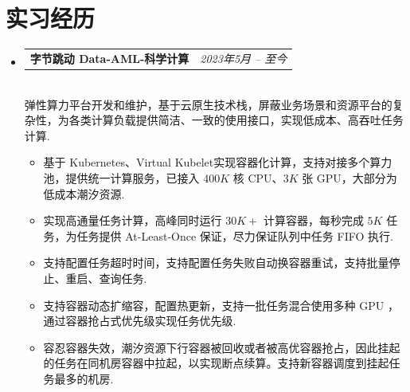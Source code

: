 \documentclass[letterpaper,11pt]{article}
\makeatletter
\newcommand{\resumeItem}[2]{
  \item\small{
    \textbf{#1}{ #2 \vspace{-2pt}}
  }
}
\newcommand{\resumeSubheadingtwo}[2]{
  \vspace{-1pt}\item
    \begin{tabular*}{0.97\textwidth}{l@{\extracolsep{\fill}}r}
      \textbf{#1} & \textit{ #2} \\
    \end{tabular*}\vspace{-5pt}
}
\newcommand{\resumeItemListStart}{\vspace{-10pt}\begin{itemize}}
\newcommand{\resumeItemListEnd}{\end{itemize}\vspace{-10pt}}
\makeatother
\begin{document}
\section{实习经历}
    \begin{itemize}[leftmargin=*,itemsep=-10pt]
        \resumeSubheadingtwo
            {字节跳动 Data-AML-科学计算}{2023年5月 -- 至今}
            \\[10pt]
            弹性算力平台开发和维护，基于云原生技术栈，屏蔽业务场景和资源平台的复杂性，为各类计算负载提供简洁、一致的使用接口，实现低成本、高吞吐任务计算.
            \resumeItemListStart
                 \resumeItem{}
                {基于 Kubernetes、Virtual Kubelet实现容器化计算，支持对接多个算力池，提供统一计算服务，已接入 $400K$ 核 CPU、$3K$ 张 GPU，大部分为低成本潮汐资源.}
                \resumeItem{}
                {实现高通量任务计算，高峰同时运行 $30K+$ 计算容器，每秒完成 $5K$ 任务，为任务提供 At-Least-Once 保证，尽力保证队列中任务 FIFO 执行.}
                \resumeItem{}
                {支持配置任务超时时间，支持配置任务失败自动换容器重试，支持批量停止、重启、查询任务.}
                \resumeItem{}
                {支持容器动态扩缩容，配置热更新，支持一批任务混合使用多种 GPU ，通过容器抢占式优先级实现任务优先级.}
                \resumeItem{}
                {容忍容器失效，潮汐资源下行容器被回收或者被高优容器抢占，因此挂起的任务在同机房容器中拉起，以实现断点续算。支持新容器调度到挂起任务最多的机房.}
            \resumeItemListEnd
    \end{itemize}

\vspace{-10pt}
\end{document}
